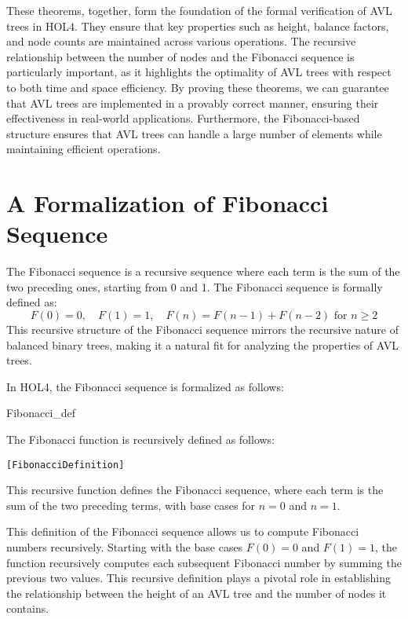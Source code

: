 These theorems, together, form the foundation of the formal verification of AVL trees in HOL4. They ensure that key properties such as height, balance factors, and node counts are maintained across various operations. The recursive relationship between the number of nodes and the Fibonacci sequence is particularly important, as it highlights the optimality of AVL trees with respect to both time and space efficiency. By proving these theorems, we can guarantee that AVL trees are implemented in a provably correct manner, ensuring their effectiveness in real-world applications. Furthermore, the Fibonacci-based structure ensures that AVL trees can handle a large number of elements while maintaining efficient operations.

\section{A Formalization of Fibonacci Sequence}

    The Fibonacci sequence is a recursive sequence where each term is the sum of the two preceding ones, starting from 0 and 1. The Fibonacci sequence is formally defined as:
    \[
    F(0) = 0, \quad F(1) = 1, \quad F(n) = F(n-1) + F(n-2) \text{ for } n \geq 2
    \]
    This recursive structure of the Fibonacci sequence mirrors the recursive nature of balanced binary trees, making it a natural fit for analyzing the properties of AVL trees.

    In HOL4, the Fibonacci sequence is formalized as follows:
   \begin{defn}{Fibonacci\_def}

    The Fibonacci function is recursively defined as follows:

     \begin{alltt}
[Fibonacci Definition]
     \end{alltt}
     

    This recursive function defines the Fibonacci sequence, where each term is the sum of the two preceding terms, with base cases for \( n = 0 \) and \( n = 1 \).
    \end{defn}


    This definition of the Fibonacci sequence allows us to compute Fibonacci numbers recursively. Starting with the base cases \( F(0) = 0 \) and \( F(1) = 1 \), the function recursively computes each subsequent Fibonacci number by summing the previous two values. This recursive definition plays a pivotal role in establishing the relationship between the height of an AVL tree and the number of nodes it contains.



